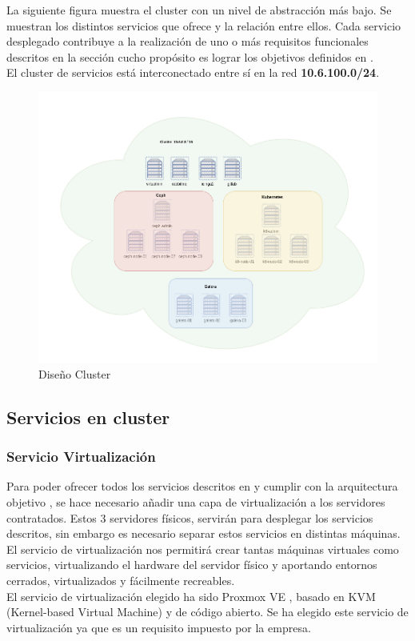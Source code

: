 \begin{text}
	La siguiente figura muestra el cluster con un nivel de abstracción más bajo. Se muestran los distintos servicios que ofrece y la relación entre ellos. Cada servicio desplegado contribuye a la realización de uno o más requisitos funcionales descritos en la sección  cucho propósito es lograr los objetivos definidos en . \\
	El cluster de servicios está interconectado entre sí en la red \textbf{10.6.100.0/24}.
\end{text}
\begin{figure}[!hbt]
	\centering
	\includegraphics[scale=0.40]{imagenes/Diseno/diagrama_cluster_2.png}
	\caption[Diseño Cluster]{Diseño Cluster} 
	\label{cluster_design}
\end{figure}

\subsection{Servicios en cluster}

\subsubsection{Servicio Virtualización}
\begin{text}
	Para poder ofrecer todos los servicios descritos en  y cumplir con la arquitectura objetivo , se hace necesario añadir una capa de virtualización a los servidores contratados. Estos 3 servidores físicos, servirán para desplegar los servicios descritos, sin embargo es necesario separar estos servicios en distintas máquinas. El servicio de virtualización nos permitirá crear tantas máquinas virtuales como servicios, virtualizando el hardware del servidor físico y aportando entornos cerrados, virtualizados y fácilmente recreables. \\
	El servicio de virtualización elegido ha sido Proxmox VE \cite{proxmox:online}, basado en KVM (Kernel-based Virtual Machine) y de código abierto. Se ha elegido este servicio de virtualización ya que es un requisito impuesto por la empresa.
\end{text}

